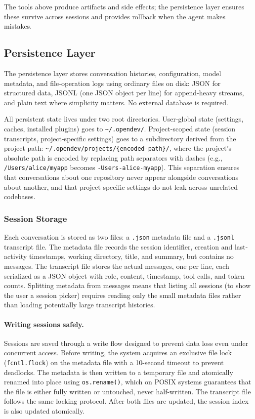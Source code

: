 The tools above produce artifacts and side effects; the persistence layer ensures these survive across sessions and provides rollback when the agent makes mistakes.

\subsection{Persistence Layer}
\label{sec:persistence}

The persistence layer stores conversation histories, configuration, model metadata, and file-operation logs using ordinary files on disk: JSON for structured data, JSONL (one JSON object per line) for append-heavy streams, and plain text where simplicity matters. No external database is required.

All persistent state lives under two root directories. User-global state (settings, caches, installed plugins) goes to \texttt{\textasciitilde/.opendev/}. Project-scoped state (session transcripts, project-specific settings) goes to a subdirectory derived from the project path: \texttt{\textasciitilde/.opendev/projects/\{encoded-path\}/}, where the project's absolute path is encoded by replacing path separators with dashes (e.g., \texttt{/Users/alice/myapp} becomes \texttt{-Users-alice-myapp}). This separation ensures that conversations about one repository never appear alongside conversations about another, and that project-specific settings do not leak across unrelated codebases.

\subsubsection{Session Storage}
\label{sec:session_management}

Each conversation is stored as two files: a \texttt{.json} metadata file and a \texttt{.jsonl} transcript file. The metadata file records the session identifier, creation and last-activity timestamps, working directory, title, and summary, but contains no messages. The transcript file stores the actual messages, one per line, each serialized as a JSON object with role, content, timestamp, tool calls, and token counts. Splitting metadata from messages means that listing all sessions (to show the user a session picker) requires reading only the small metadata files rather than loading potentially large transcript histories.

\paragraph{Writing sessions safely.} Sessions are saved through a write flow designed to prevent data loss even under concurrent access. Before writing, the system acquires an exclusive file lock (\texttt{fcntl.flock}) on the metadata file with a 10-second timeout to prevent deadlocks. The metadata is then written to a temporary file and atomically renamed into place using \texttt{os.rename()}, which on POSIX systems guarantees that the file is either fully written or untouched, never half-written. The transcript file follows the same locking protocol. After both files are updated, the session index is also updated atomically.

